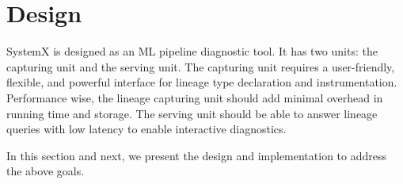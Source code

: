 \documentclass{sig-alternate}
\begin{document}
%
%

\section{Design}
\label{sec:Design}
SystemX is designed as an ML pipeline diagnostic tool. 
It has two units: the capturing unit and the serving unit.
The capturing unit requires a user-friendly, flexible, and powerful interface for lineage type declaration and instrumentation.
Performance wise, the lineage capturing unit should add minimal overhead in running time and storage.
The serving unit should be able to answer lineage queries with low latency to enable interactive diagnostics.

In this section and next, we present the design and implementation to address the above goals.
\end{document}
